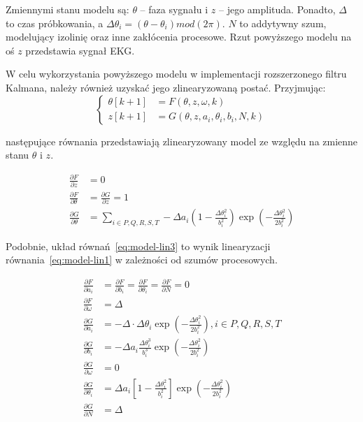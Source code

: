 Zmiennymi stanu modelu są: $\theta$ -- faza sygnału i $z$ -- jego amplituda. Ponadto, $\Delta$ to czas próbkowania, a $\Delta \theta_i = (\theta - \theta_i)mod(2 \pi)$. $N$ to addytywny szum, modelujący izolinię oraz inne zakłócenia procesowe. Rzut powyższego modelu na oś $z$ przedstawia sygnał EKG.

W celu wykorzystania powyższego modelu w implementacji rozszerzonego filtru Kalmana, należy również uzyskać jego zlinearyzowaną postać. Przyjmując:
\begin{equation}
\begin{cases}
	\theta[k+1] &= F(\theta, z, \omega, k) \\
	z[k+1] &=  G(\theta, z, a_i, \theta_i, b_i, N, k)
\end{cases}
\label{eq:model-lin1}
\end{equation}

następujące równania przedstawiają zlinearyzowany model ze względu na zmienne stanu $\theta$ i $z$. 

\begin{equation}
\begin{split}
	\frac{\partial F}{\partial z} &= 0 \\
	\frac{\partial F}{\partial \theta} &= \frac{\partial G}{\partial z} = 1 \\
	\frac{\partial G}{\partial \theta} &= \sum_{i \in {P, Q, R, S, T} } - \Delta a_i \left( 1 - \frac{\Delta \theta_i^2}{b_i^2} \right) \exp \left({- \frac{\Delta \theta_i^2}{2 b_i^2}} \right)
\end{split}
\label{eq:model-lin2}
\end{equation}

Podobnie, układ równań~\ref{eq:model-lin3} to wynik linearyzacji równania~\ref{eq:model-lin1} w zależności od szumów procesowych.

\begin{equation}
\begin{split}
	\frac{\partial F}{\partial a_i} &= \frac{\partial F}{\partial b_i} = \frac{\partial F}{\partial \theta_i} = \frac{\partial F}{\partial N} = 0 \\
	\frac{\partial F}{\partial \omega} &= \Delta \\
	\frac{\partial G}{\partial a_i} &= - \Delta \cdot \Delta \theta_i \exp \left({- \frac{\Delta \theta_i^2}{2 b_i^2}} \right), i \in {P, Q, R, S, T} \\
	\frac{\partial G}{\partial b_i} &= - \Delta a_i \frac{\Delta \theta_i^3}{b_i^3} \exp \left({- \frac{\Delta \theta_i^2}{2 b_i^2}} \right) \\
	\frac{\partial G}{\partial \omega} &= 0 \\
	\frac{\partial G}{\partial \theta_i} &= \Delta a_i \left[1 - \frac{\Delta \theta_i^2}{b_i^2} \right] \exp \left({- \frac{\Delta \theta_i^2}{2 b_i^2}} \right) \\
	\frac{\partial G}{\partial N} &= \Delta 
\end{split}
\label{eq:model-lin3}
\end{equation}

